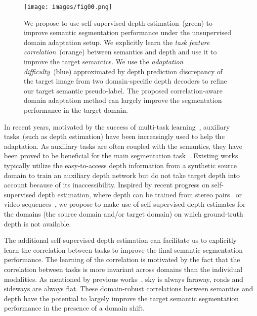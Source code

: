\documentclass[10pt,twocolumn,letterpaper]{article}
\begin{document}
\begin{figure}[ht!]
	\centering
	\texttt{[image: images/fig00.png]}
	\caption{We propose to use self-supervised depth estimation~(green) to improve semantic segmentation performance under the unsupervised domain adaptation setup. We explicitly learn the \textit{task feature correlation}~(orange) between semantics and depth and use it to improve the target semantics. We use the \textit{adaptation difficulty}~(blue) approximated by depth prediction discrepancy of the target image from two domain-specific depth decoders to refine our target semantic pseudo-label. The proposed correlation-aware domain adaptation method can largely improve the segmentation performance in the target domain.}
	\label{view}
\end{figure}

In recent years, motivated by the success of multi-task learning~\cite{zamir2018taskonomy, xu2018pad},  auxiliary tasks~(such as depth estimation) have been increasingly used to help the adaptation. As auxiliary tasks are often coupled with the semantics, they have been proved to be beneficial for the main segmentation task~\cite{lee2018spigan}. Existing works~\cite{vu2019dada, chen2019learning} typically utilize the easy-to-access depth information from a synthetic source domain to train an auxiliary depth network but do not take target depth into account because of its inaccessibility. Inspired by recent progress on self-supervised depth estimation, where depth can be trained from stereo pairs~\cite{garg2016unsupervised, godard2017unsupervised} or video sequences~\cite{zhou2017unsupervised}, we propose to make use of self-supervised depth estimates for the domains (the source domain and/or target domain) on which ground-truth depth is not available. 


The additional self-supervised depth estimation can facilitate us to explicitly learn the correlation between tasks to improve the final semantic segmentation performance. The learning of the correlation is motivated by the fact that the correlation between tasks is more invariant across domains than the individual modalities. As mentioned by previous works~\cite{chen2019learning}, sky is always faraway, roads and sideways are always flat. These domain-robust correlations between semantics and depth have the potential to largely improve the target semantic segmentation performance in the presence of a domain shift.
\end{document}

